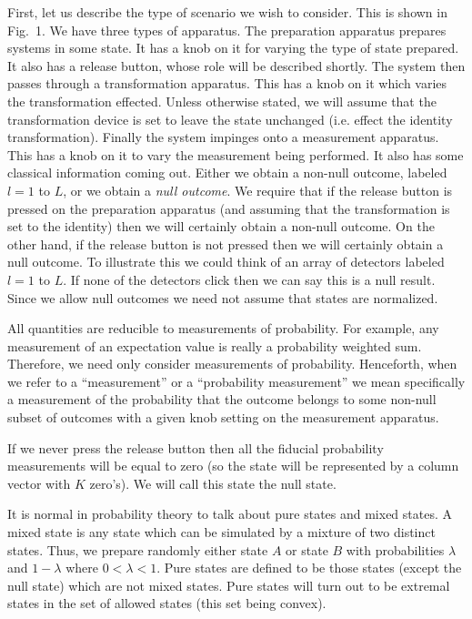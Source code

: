 \documentclass[12pt]{article}
\begin{document}
First, let us describe the type of scenario we wish to consider. This is
shown in Fig.~1.  We have three types of apparatus. The preparation
apparatus prepares systems in some state.  It has a knob on it for
varying the type of state prepared. It also has a release button, whose
role will be described shortly.  The system then
passes through a transformation apparatus. This has a knob on
it which varies the transformation effected. Unless otherwise stated, we
will assume that the transformation device is set to leave the state
unchanged (i.e. effect the identity transformation).  Finally the system
impinges onto a measurement apparatus.  This has a knob on it to vary
the measurement being performed.  It also has some classical information
coming out. Either we obtain a non-null outcome, labeled $l=1$ to $L$, or we
obtain a {\it null outcome}.  We require that if the release button is
pressed on the preparation apparatus (and assuming that the
transformation is set to the identity) then we will certainly obtain a
non-null outcome. On the other hand, if the release button is not
pressed then we will certainly obtain a null outcome.  To illustrate
this we could think of an array of detectors labeled $l=1$ to $L$. If
none of the detectors click then we can say this is a null result.
Since we allow null outcomes we need not assume that states are
normalized.

All quantities are reducible to measurements of probability.  For
example, any measurement of an expectation value is really a probability
weighted sum.  Therefore, we need only consider measurements of probability.
Henceforth, when we refer to a ``measurement'' or a ``probability
measurement'' we mean specifically a measurement of the probability
that the outcome belongs to some non-null subset of outcomes with a
given knob setting on the measurement apparatus.

If we never press the release button then all the fiducial probability
measurements will be equal to zero (so the state will be represented by
a column vector with $K$ zero's). We will call this state the null state.

It is normal in probability theory to talk about pure states and mixed
states.  A mixed state is any state which can be simulated by a mixture
of two distinct states. Thus, we prepare randomly either state $A$ or
state $B$ with probabilities $\lambda$ and $1-\lambda$ where
$0<\lambda<1$.  Pure states are defined to be those states
(except the null state) which are not mixed states.  Pure states will
turn out to be extremal states in the set of allowed states (this set
being convex).
\end{document}
